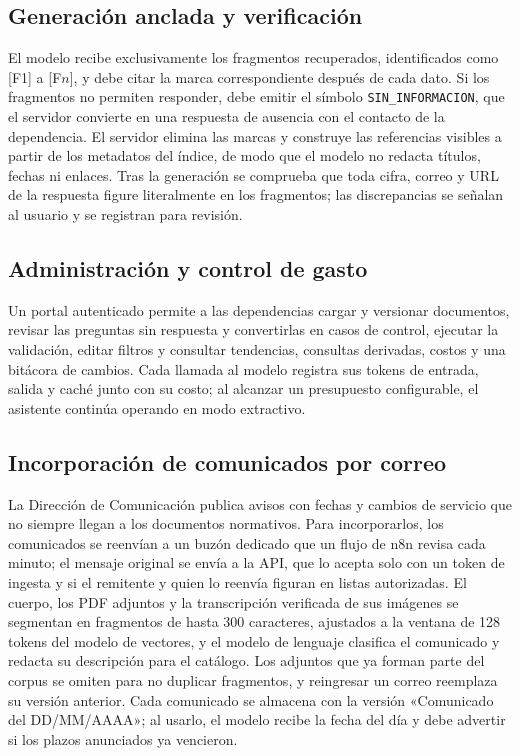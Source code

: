 \documentclass[conference]{IEEEtran}
\begin{document}
\subsection{Generación anclada y verificación}
El modelo recibe exclusivamente los fragmentos recuperados, identificados como [F1] a [F$n$], y debe citar la marca correspondiente después de cada dato. Si los fragmentos no permiten responder, debe emitir el símbolo \texttt{SIN\_INFORMACION}, que el servidor convierte en una respuesta de ausencia con el contacto de la dependencia. El servidor elimina las marcas y construye las referencias visibles a partir de los metadatos del índice, de modo que el modelo no redacta títulos, fechas ni enlaces. Tras la generación se comprueba que toda cifra, correo y URL de la respuesta figure literalmente en los fragmentos; las discrepancias se señalan al usuario y se registran para revisión.

\subsection{Administración y control de gasto}
Un portal autenticado permite a las dependencias cargar y versionar documentos, revisar las preguntas sin respuesta y convertirlas en casos de control, ejecutar la validación, editar filtros y consultar tendencias, consultas derivadas, costos y una bitácora de cambios. Cada llamada al modelo registra sus tokens de entrada, salida y caché junto con su costo; al alcanzar un presupuesto configurable, el asistente continúa operando en modo extractivo.

\subsection{Incorporación de comunicados por correo}
La Dirección de Comunicación publica avisos con fechas y cambios de servicio que no siempre llegan a los documentos normativos. Para incorporarlos, los comunicados se reenvían a un buzón dedicado que un flujo de n8n revisa cada minuto; el mensaje original se envía a la API, que lo acepta solo con un token de ingesta y si el remitente y quien lo reenvía figuran en listas autorizadas. El cuerpo, los PDF adjuntos y la transcripción verificada de sus imágenes se segmentan en fragmentos de hasta 300 caracteres, ajustados a la ventana de 128 tokens del modelo de vectores, y el modelo de lenguaje clasifica el comunicado y redacta su descripción para el catálogo. Los adjuntos que ya forman parte del corpus se omiten para no duplicar fragmentos, y reingresar un correo reemplaza su versión anterior. Cada comunicado se almacena con la versión «Comunicado del DD/MM/AAAA»; al usarlo, el modelo recibe la fecha del día y debe advertir si los plazos anunciados ya vencieron.
\end{document}
